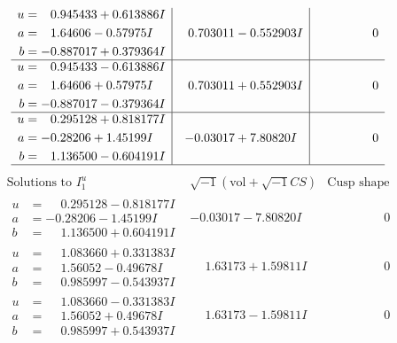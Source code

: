 \documentclass[1p]{elsarticle_modified}
\theoremstyle{definition}
\newcommand{\I}{\sqrt{-1}}
\begin{document}
$$\begin{array}{c|c|c}
\begin{aligned}
u &= \phantom{-}0.945433 + 0.613886 I \\
a &= \phantom{-}1.64606 - 0.57975 I \\
b &= -0.887017 + 0.379364 I\end{aligned}
 & \phantom{-}0.703011 - 0.552903 I & \phantom{-0.000000 } 0 \\ \hline\begin{aligned}
u &= \phantom{-}0.945433 - 0.613886 I \\
a &= \phantom{-}1.64606 + 0.57975 I \\
b &= -0.887017 - 0.379364 I\end{aligned}
 & \phantom{-}0.703011 + 0.552903 I & \phantom{-0.000000 } 0 \\ \hline\begin{aligned}
u &= \phantom{-}0.295128 + 0.818177 I \\
a &= -0.28206 + 1.45199 I \\
b &= \phantom{-}1.136500 - 0.604191 I\end{aligned}
 & -0.03017 + 7.80820 I & \phantom{-0.000000 } 0\\
 \hline 
 \end{array}$$\newpage$$\begin{array}{c|c|c}  
\text{Solutions to }I^u_{1}& \I (\text{vol} + \sqrt{-1}CS) & \text{Cusp shape}\\
 \hline 
\begin{aligned}
u &= \phantom{-}0.295128 - 0.818177 I \\
a &= -0.28206 - 1.45199 I \\
b &= \phantom{-}1.136500 + 0.604191 I\end{aligned}
 & -0.03017 - 7.80820 I & \phantom{-0.000000 } 0 \\ \hline\begin{aligned}
u &= \phantom{-}1.083660 + 0.331383 I \\
a &= \phantom{-}1.56052 - 0.49678 I \\
b &= \phantom{-}0.985997 - 0.543937 I\end{aligned}
 & \phantom{-}1.63173 + 1.59811 I & \phantom{-0.000000 } 0 \\ \hline\begin{aligned}
u &= \phantom{-}1.083660 - 0.331383 I \\
a &= \phantom{-}1.56052 + 0.49678 I \\
b &= \phantom{-}0.985997 + 0.543937 I\end{aligned}
 & \phantom{-}1.63173 - 1.59811 I & \phantom{-0.000000 } 0 \\ \hline\begin{aligned}

\end{aligned}
\end{array}$$
\end{document}
